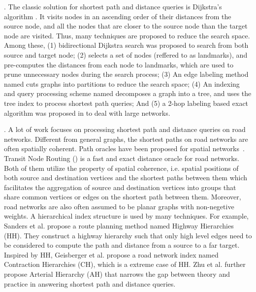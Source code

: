 .
The classic solution for shortest path and distance queries is Dijkstra's algorithm \cite{Dijkstra59}. It visits nodes in an ascending order of their distances from the source node, and all the nodes that are closer to the source node than the target node are visited. Thus, many techniques are proposed to reduce the search space. Among these, (1) bidirectional Dijkstra search \cite{LubyR89} was proposed to search from both source and target node; (2) \alt \cite{GoldbergH05} selects a set of nodes (reffered to as landmarks), and pre-computes the distances from each node to landmarks, which are used to prune unnecessary nodes during the search process; (3) An edge labeling method named \arcflag \cite{MohringSSWW05} cuts graphs into partitions to reduce the search space;
(4) An indexing and query processing scheme named \tedi \cite{Wei10} decomposes a graph into a tree, and uses the tree index to process shortest path queries; And (5) a 2-hop labeling based exact algorithm was proposed in \cite{delling2014robust} to deal with large networks.





.
 A lot of work focuses on processing shortest path and distance queries on road networks. Different from general graphs, the shortest paths on road networks are often spatially coherent. Path oracles have been proposed for spatial networks~\cite{SankaranarayananSA09}. Transit Node Routing (\tnr) \cite{arz2013transit} is a fast and exact distance oracle for road networks. Both of them utilize the property of spatial coherence, i.e. spatial positions of both source and destination vertices and the shortest paths between them which facilitates the aggregation of source and destination vertices into groups that share common vertices or edges on the shortest path between them. Moreover, road networks are also often assumed to be planar graphs with non-negetive weights\cite{fakcharoenphol2006planar,gupta2004roads,klein2010shortest,MozesS12}. A hierarchical index structure is used by many techniques\cite{SandersS05, GeisbergerSSD08, zhu2013shortest}. For example, Sanders et al. propose a route planning method named Highway Hierarchies (HH)\cite{SandersS05}. They construct a highway hierarchy such that only high level edges need to be considered to compute the path and distance from a source to a far target. Inspired by HH, Geisberger et al.\cite{GeisbergerSSD08} propose a road network index named Contraction Hierarchies (CH), which is a extreme case of HH. Zhu et al. further propose Arterial Hierarchy (AH)\cite{zhu2013shortest} that narrows the gap between theory and practice in answering shortest path and distance queries.

